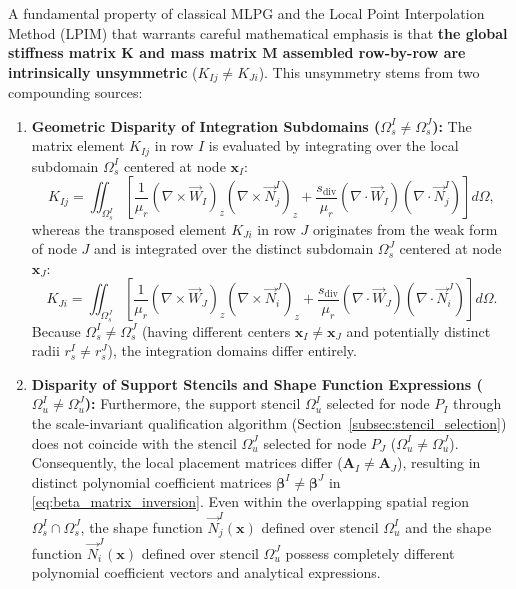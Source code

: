 \documentclass[VANCOUVER,Times1COL]{WileyNJD-v5}
\begin{document}
\begin{remark}
    A fundamental property of classical MLPG \cite{atluri2002meshless} and the Local Point Interpolation Method (LPIM) \cite{liu2001local, liu2005introduction} that warrants careful mathematical emphasis is that \textbf{the global stiffness matrix $\mathbf{K}$ and mass matrix $\mathbf{M}$ assembled row-by-row are intrinsically unsymmetric} ($K_{Ij} \ne K_{Ji}$).
    This unsymmetry stems from two compounding sources:
    \begin{enumerate}
        \item \textbf{Geometric Disparity of Integration Subdomains ($\Omega_s^I \ne \Omega_s^J$):}
              The matrix element $K_{Ij}$ in row $I$ is evaluated by integrating over the local subdomain $\Omega_s^I$ centered at node $\mathbf{x}_I$:
              \begin{equation}
                  K_{Ij} = \iint_{\Omega_s^I} \left[ \frac{1}{\mu_r} (\nabla \times \vec{W}_I)_z (\nabla \times \vec{N}_j^I)_z + \frac{s_{\mathrm{div}}}{\mu_r} (\nabla \cdot \vec{W}_I) (\nabla \cdot \vec{N}_j^I) \right] d\Omega,
              \end{equation}
              whereas the transposed element $K_{Ji}$ in row $J$ originates from the weak form of node $J$ and is integrated over the distinct subdomain $\Omega_s^J$ centered at node $\mathbf{x}_J$:
              \begin{equation}
                  K_{Ji} = \iint_{\Omega_s^J} \left[ \frac{1}{\mu_r} (\nabla \times \vec{W}_J)_z (\nabla \times \vec{N}_i^J)_z + \frac{s_{\mathrm{div}}}{\mu_r} (\nabla \cdot \vec{W}_J) (\nabla \cdot \vec{N}_i^J) \right] d\Omega.
              \end{equation}
              Because $\Omega_s^I \ne \Omega_s^J$ (having different centers $\mathbf{x}_I \ne \mathbf{x}_J$ and potentially distinct radii $r_s^I \ne r_s^J$), the integration domains differ entirely.
        \item \textbf{Disparity of Support Stencils and Shape Function Expressions ($\Omega_u^I \ne \Omega_u^J$):}
              Furthermore, the support stencil $\Omega_u^I$ selected for node $P_I$ through the scale-invariant qualification algorithm (Section~\ref{subsec:stencil_selection}) does not coincide with the stencil $\Omega_u^J$ selected for node $P_J$ ($\Omega_u^I \ne \Omega_u^J$). Consequently, the local placement matrices differ ($\mathbf{A}_I \ne \mathbf{A}_J$), resulting in distinct polynomial coefficient matrices $\boldsymbol{\beta}^I \ne \boldsymbol{\beta}^J$ in \eqref{eq:beta_matrix_inversion}. Even within the overlapping spatial region $\Omega_s^I \cap \Omega_s^J$, the shape function $\vec{N}_j^I(\mathbf{x})$ defined over stencil $\Omega_u^I$ and the shape function $\vec{N}_i^J(\mathbf{x})$ defined over stencil $\Omega_u^J$ possess completely different polynomial coefficient vectors and analytical expressions.

\end{enumerate}
\end{remark}
\end{document}

